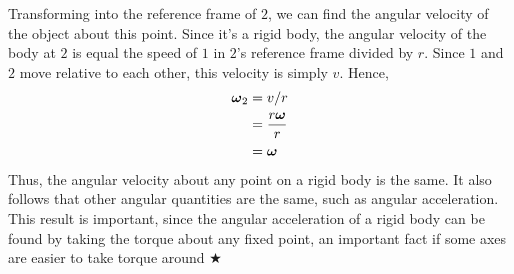 \noindent Transforming into the reference frame of $2$, we can find the angular velocity of the object about this point. Since it's a rigid body, the angular velocity of the body at $2$ is equal the speed of $1$ in $2$'s reference frame divided by $r$. Since $1$ and $2$ move relative to each other, this velocity is simply $v$. Hence,
\begin{align}
    \boldsymbol{\omega}_2 &= v/r \nonumber \\
    &= \frac{r\boldsymbol{\omega}}{r} \nonumber \\
    &= \boldsymbol{\omega} \nonumber
\end{align}
\noindent Thus, the angular velocity about any point on a rigid body is the same. It also follows that other angular quantities are the same, such as angular acceleration. This result is important, since the angular acceleration of a rigid body can be found by taking the torque about any fixed point, an important fact if some axes are easier to take torque around $\bigstar$


%
%
